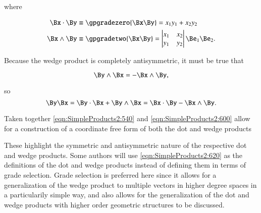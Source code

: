 
where

\begin{dmath}\label{eqn:SimpleProducts2:560}
\begin{aligned}
\Bx \cdot \By &\equiv \gpgradezero{\Bx\By} = x_1 y_1 + x_2 y_2 \\
\Bx \wedge \By &\equiv \gpgradetwo{\Bx\By} =
\begin{vmatrix}
   x_1 & x_2 \\
   y_1 & y_2
\end{vmatrix}
   \Be_1 \Be_2. \\
\end{aligned}
\end{dmath}

Because the wedge product is completely antisymmetric, it must be true that

\begin{dmath}\label{eqn:SimpleProducts2:580}
\By \wedge \Bx = -\Bx \wedge \By,
\end{dmath}

so
\begin{dmath}\label{eqn:SimpleProducts2:600}
\By \Bx
= \By \cdot \Bx + \By \wedge \Bx
= \Bx \cdot \By - \Bx \wedge \By.
\end{dmath}

Taken together \cref{eqn:SimpleProducts2:540} and \cref{eqn:SimpleProducts2:600} allow for a construction of a coordinate free form of both the dot and wedge products


These highlight the symmetric and antisymmetric nature of the respective dot and wedge products.  Some authors will use \cref{eqn:SimpleProducts2:620} as the definitions of the dot and wedge products instead of defining them in terms of grade selection.  Grade selection is preferred here since it allows for a generalization of the wedge product to multiple vectors in higher degree spaces in a particularily simple way, and also allows for the generalization of the dot and wedge products with higher order geometric structures to be discussed.

